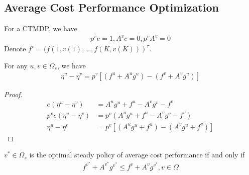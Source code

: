 \documentclass[runningheads]{llncs}
\begin{document}
    \subsection{Average Cost Performance Optimization}
    For a CTMDP, we have
    \begin{align}
        p^v e = 1, A^v e = 0, p^v A^v = 0
    \end{align}
    Denote $f^v = (f(1, v(1), ..., f(K, v(K)))^\tau$.
    \begin{lemma}
        For any $u, v \in \Omega_s$, we have
        \begin{align}
            \eta^u - \eta^v = p^v [(f^u + A^ug^u) - (f^v + A^vg^u)]
        \end{align}
    \end{lemma}
    \begin{proof}
        \begin{align}
            e(\eta^u - \eta^v) &= A^u g^u + f^u - A^v g^v - f^v \\
            p^v e(\eta^u - \eta^v) &= p^v (A^u g^u + f^u - A^v g^v - f^v) \\
            \eta^u - \eta^v &= p^v [(A^u g^u + f^u ) - (A^vg^u + f^v)]
        \end{align}
    \end{proof}
    \begin{theorem}
        $v^* \in \Omega_s$ is the optimal steady policy of average cost performance if and only if
        \begin{align}
            f^{v^*} + A^{v^*} g^{v^*} \leq f^v + A^v g^{v^*}, v \in \Omega
        \end{align}
    \end{theorem}

    
\end{document}
